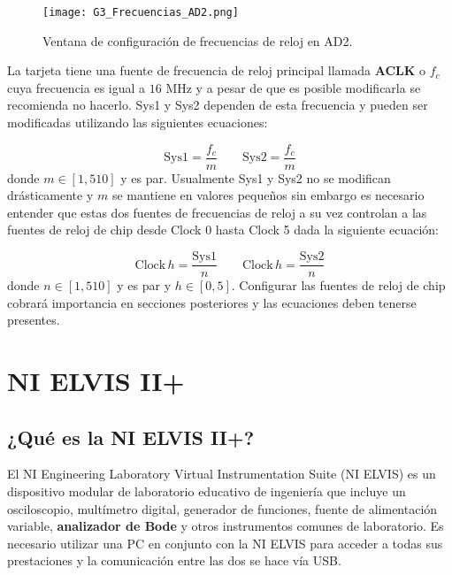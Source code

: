 	\begin{figure}[!hbp] 
		\caption{Ventana de configuración de frecuencias de reloj en AD2.}
		\label{fig:G3_Frecuencias_AD2}
		\centering
		\texttt{[image: G3\_Frecuencias\_AD2.png]}
	\end{figure}

	La tarjeta tiene una fuente de frecuencia de reloj principal llamada \textbf{ACLK} o $f_{c}$ cuya frecuencia es igual a $16$ MHz y a pesar de que es posible modificarla se recomienda no hacerlo. Sys1 y Sys2 dependen de esta frecuencia y pueden ser modificadas utilizando las siguientes ecuaciones:

	\begin{equation}
		\mathrm{Sys1} = \frac{f_{c}}{m} \qquad \mathrm{Sys2} = \frac{f_{c}}{m}
		\label{ec:sys_clock}
	\end{equation}
	donde $m\in [1,510]$ y es par. Usualmente Sys1 y Sys2 no se modifican drásticamente y $m$ se mantiene en valores pequeños sin embargo es necesario entender que estas dos fuentes de frecuencias de reloj a su vez controlan a las fuentes de reloj de chip desde Clock 0 hasta Clock 5 dada la siguiente ecuación:

	\begin{equation}
		\mathrm{Clock\,} h = \frac{\mathrm{Sys1}}{n}	\qquad   \mathrm{Clock\,} h = \frac{\mathrm{Sys2}}{n}
		\label{ec:clock_h}
	\end{equation}
	donde $n\in[1,510]$ y es par y $h\in[0,5]$. Configurar las fuentes de reloj de chip cobrará importancia en secciones posteriores y las ecuaciones deben tenerse presentes.

	\section{NI ELVIS II+}

		\subsection{¿Qué es la NI ELVIS II+?}
	El NI Engineering Laboratory Virtual Instrumentation Suite (NI ELVIS) es un dispositivo modular de laboratorio educativo de ingeniería que incluye un osciloscopio, multímetro digital, generador de funciones, fuente de alimentación variable, \textbf{analizador de Bode} y otros instrumentos comunes de laboratorio. Es necesario utilizar una PC en conjunto con la NI ELVIS para acceder a todas sus prestaciones y la comunicación entre las dos se hace vía USB.

